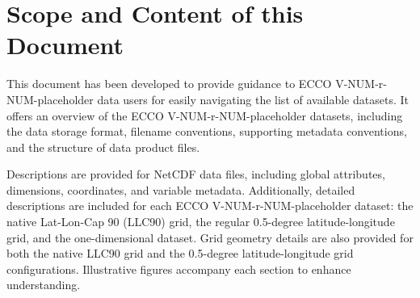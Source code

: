 \pagebreak
\section{Scope and Content of this Document}

\par This document has been developed to provide guidance to ECCO V-NUM-r-NUM-placeholder data users for easily navigating the list of available datasets. It offers an overview of the ECCO V-NUM-r-NUM-placeholder datasets, including the data storage format, filename conventions, supporting metadata conventions, and the structure of data product files.

\par Descriptions are provided for NetCDF data files, including global attributes, dimensions, coordinates, and variable metadata. Additionally, detailed descriptions are included for each ECCO V-NUM-r-NUM-placeholder dataset: the native Lat-Lon-Cap 90 (LLC90) grid, the regular 0.5-degree latitude-longitude grid, and the one-dimensional dataset. Grid geometry details are also provided for both the native LLC90 grid and the 0.5-degree latitude-longitude grid configurations. Illustrative figures accompany each section to enhance understanding.
